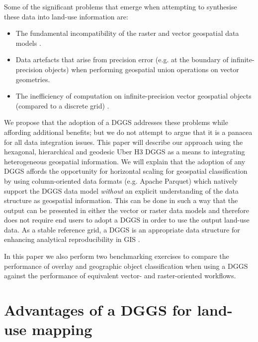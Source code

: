 \documentclass[]{interact}
\theoremstyle{plain}%
\theoremstyle{definition}
\theoremstyle{remark}
\begin{document}
Some of the significant problems that emerge when attempting to synthesise these data into land-use information are:

\begin{itemize}
    \item The fundamental incompatibility of the raster and vector geospatial data models \citep{piwowar1990integration,goodchild1994integrating}.
    \item Data artefacts that arise from precision error (e.g. at the boundary of infinite-precision objects) when performing geospatial union operations on vector geometries. \citep{schneider2003design,veregin1989error}
    \item The inefficiency of computation on infinite-precision vector geospatial objects (compared to a discrete grid) \citep{hojati2022giscience}.
\end{itemize}

We propose that the adoption of a \acf{DGGS} addresses these problems while affording additional benefits; but we do not attempt to argue that it is a panacea for all data integration issues. This paper will describe our approach using the hexagonal, hierarchical and geodesic Uber H3 \ac{DGGS} \citep{brodsky2018h3} as a means to integrating heterogeneous geospatial information. We will explain that the adoption of any \ac{DGGS} affords the opportunity for horizontal scaling for geospatial classification by using column-oriented data formats (e.g. Apache Parquet) which natively support the \ac{DGGS} data model \textit{without} an explicit understanding of the data structure as geospatial information. This can be done in such a way that the output can be presented in either the vector or raster data models and therefore does not require end users to adopt a \ac{DGGS} in order to use the output land-use data. As a stable reference grid, a \ac{DGGS} is an appropriate data structure for enhancing analytical reproducibility in \ac{GIS} \citep{purss2019datacubes,etherington2022}.

In this paper we also perform two benchmarking exercises to compare the performance of overlay and geographic object classification when using a \ac{DGGS} against the performance of equivalent vector- and raster-oriented workflows.

\section{Advantages of a \ac{DGGS} for land-use mapping} %
\end{document}
